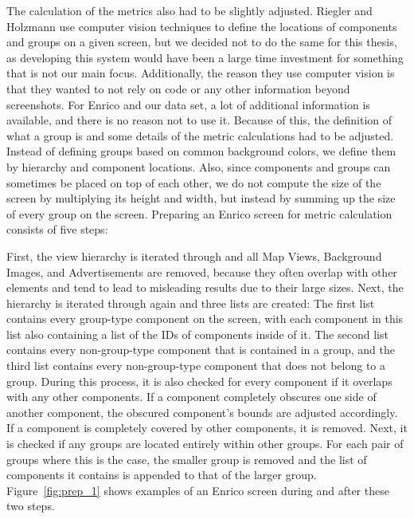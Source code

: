 \documentclass[11pt,titlepage,oneside,openany]{book}
\begin{document}
The calculation of the metrics also had to be slightly adjusted. Riegler and Holzmann use computer vision techniques to define the locations of components and groups on a given screen, but we decided not to do the same for this thesis, as developing this system would have been a large time investment for something that is not our main focus. Additionally, the reason they use computer vision is that they wanted to not rely on code or any other information beyond screenshots. For Enrico and our data set, a lot of additional information is available, and there is no reason not to use it. Because of this, the definition of what a group is and some details of the metric calculations had to be adjusted. Instead of defining groups based on common background colors, we define them by hierarchy and component locations. Also, since components and groups can sometimes be placed on top of each other, we do not compute the size of the screen by multiplying its height and width, but instead by summing up the size of every group on the screen. Preparing an Enrico screen for metric calculation consists of five steps:

First, the view hierarchy is iterated through and all Map Views, Background Images, and Advertisements are removed, because they often overlap with other elements and tend to lead to misleading results due to their large sizes. Next, the hierarchy is iterated through again and three lists are created: The first list contains every group-type component on the screen, with each component in this list also containing a list of the IDs of components inside of it. The second list contains every non-group-type component that is contained in a group, and the third list contains every non-group-type component that does not belong to a group. During this process, it is also checked for every component if it overlaps with any other components. If a component completely obscures one side of another component, the obscured component's bounds are adjusted accordingly. If a component is completely covered by other components, it is removed. Next, it is checked if any groups are located entirely within other groups. For each pair of groups where this is the case, the smaller group is removed and the list of components it contains is appended to that of the larger group. Figure~\ref{fig:prep_1} shows examples of an Enrico screen during and after these two steps.
\end{document}
